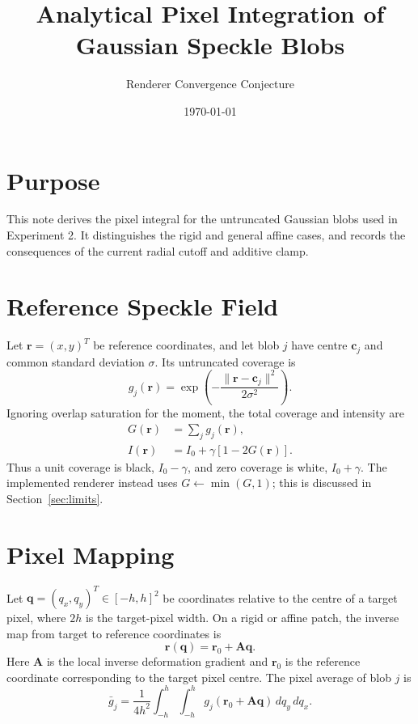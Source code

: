 \documentclass[11pt,a4paper]{article}
\title{Analytical Pixel Integration of Gaussian Speckle Blobs}
\author{Renderer Convergence Conjecture}
\date{\today}
\begin{document}
\maketitle

\section{Purpose}

This note derives the pixel integral for the untruncated Gaussian blobs used
in Experiment 2.  It distinguishes the rigid and general affine cases, and
records the consequences of the current radial cutoff and additive clamp.

\section{Reference Speckle Field}

Let $\mathbf{r}=(x,y)^T$ be reference coordinates, and let blob $j$ have
centre $\mathbf{c}_j$ and common standard deviation $\sigma$.  Its
untruncated coverage is
\begin{equation}
 g_j(\mathbf{r}) =
 \exp\left(-\frac{\lVert\mathbf{r}-\mathbf{c}_j\rVert^2}
 {2\sigma^2}\right).
\end{equation}
Ignoring overlap saturation for the moment, the total coverage and intensity
are
\begin{align}
 G(\mathbf{r}) &= \sum_j g_j(\mathbf{r}), \\
 I(\mathbf{r}) &= I_0 + \gamma\left[1-2G(\mathbf{r})\right].
\end{align}
Thus a unit coverage is black, $I_0-\gamma$, and zero coverage is white,
$I_0+\gamma$.  The implemented renderer instead uses
$G \leftarrow \min(G,1)$; this is discussed in Section~\ref{sec:limits}.

\section{Pixel Mapping}

Let $\mathbf{q}=(q_x,q_y)^T\in[-h,h]^2$ be coordinates relative to the
centre of a target pixel, where $2h$ is the target-pixel width.  On a rigid
or affine patch, the inverse map from target to reference coordinates is
\begin{equation}
 \mathbf{r}(\mathbf{q}) = \mathbf{r}_0 + \mathbf{A}\mathbf{q}.
 \label{eq:affine-map}
\end{equation}
Here $\mathbf{A}$ is the local inverse deformation gradient and
$\mathbf{r}_0$ is the reference coordinate corresponding to the target
pixel centre.  The pixel average of blob $j$ is
\begin{equation}
 \bar{g}_j = \frac{1}{4h^2}
 \int_{-h}^{h}\int_{-h}^{h}
 g_j\left(\mathbf{r}_0+\mathbf{A}\mathbf{q}\right)
 \,dq_y\,dq_x.
 \label{eq:pixel-average}
\end{equation}
\end{document}
